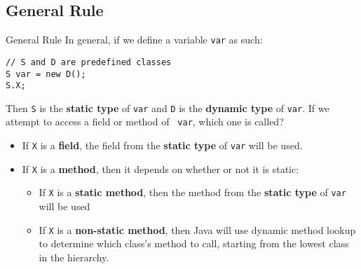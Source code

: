 \documentclass[9pt]{beamer}
\begin{document}
\subsection{General Rule}
\begin{frame}[fragile]{General Rule}
  In general, if we define a variable {\tt var} as such:
  \begin{lstlisting}
// S and D are predefined classes
S var = new D();
S.X;
  \end{lstlisting}
  Then {\tt S} is the {\bf static type} of {\tt var} and {\tt D} is the {\bf
  dynamic type} of {\tt var}. If we attempt to access a field or method of {\tt
  var}, which one is called?
  \begin{itemize}
    \item
      If {\tt X} is a {\bf field}, the field from the {\bf static type} of 
      {\tt var} will be used.
    \item
      If {\tt X} is a {\bf method}, then it depends on whether or not it is
      static:
      \begin{itemize}
        \item
          If {\tt X} is a {\bf static method}, then the method from the {\bf
          static type} of {\tt var} will be used
        \item
          If {\tt X} is a {\bf non-static method}, then Java will use dynamic
          method lookup to determine which class's method to call, starting from
          the lowest class in the hierarchy.
      \end{itemize}
  \end{itemize}
\end{frame}

\end{document}
